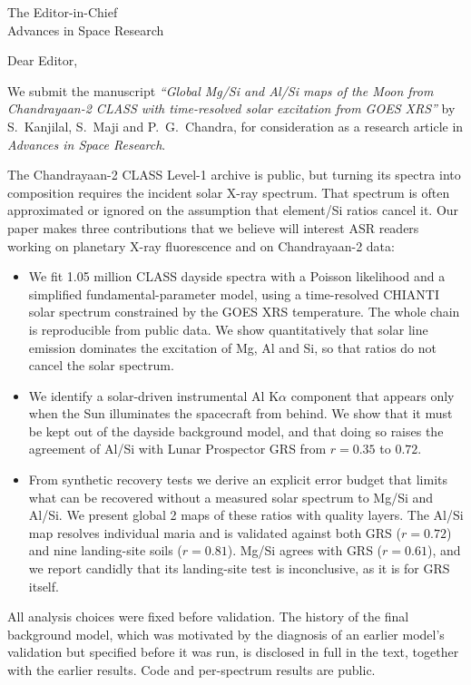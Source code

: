 \documentclass[11pt]{letter}
\begin{document}
\begin{letter}{The Editor-in-Chief\\Advances in Space Research}
\opening{Dear Editor,}

We submit the manuscript \emph{``Global Mg/Si and Al/Si maps of the Moon from Chandrayaan-2 CLASS with time-resolved solar excitation from GOES XRS''} by S.~Kanjilal, S.~Maji and P.~G.~Chandra, for consideration as a research article in \emph{Advances in Space Research}.

The Chandrayaan-2 CLASS Level-1 archive is public, but turning its spectra into composition requires the incident solar X-ray spectrum. That spectrum is often approximated or ignored on the assumption that element/Si ratios cancel it. Our paper makes three contributions that we believe will interest ASR readers working on planetary X-ray fluorescence and on Chandrayaan-2 data:
\begin{itemize}
\item We fit 1.05 million CLASS dayside spectra with a Poisson likelihood and a simplified fundamental-parameter model, using a time-resolved CHIANTI solar spectrum constrained by the GOES XRS temperature. The whole chain is reproducible from public data. We show quantitatively that solar line emission dominates the excitation of Mg, Al and Si, so that ratios do not cancel the solar spectrum.
\item We identify a solar-driven instrumental Al K$\alpha$ component that appears only when the Sun illuminates the spacecraft from behind. We show that it must be kept out of the dayside background model, and that doing so raises the agreement of Al/Si with Lunar Prospector GRS from $r=0.35$ to $0.72$.
\item From synthetic recovery tests we derive an explicit error budget that limits what can be recovered without a measured solar spectrum to Mg/Si and Al/Si. We present global 2\textdegree{} maps of these ratios with quality layers. The Al/Si map resolves individual maria and is validated against both GRS ($r=0.72$) and nine landing-site soils ($r=0.81$). Mg/Si agrees with GRS ($r=0.61$), and we report candidly that its landing-site test is inconclusive, as it is for GRS itself.
\end{itemize}

All analysis choices were fixed before validation. The history of the final background model, which was motivated by the diagnosis of an earlier model's validation but specified before it was run, is disclosed in full in the text, together with the earlier results. Code and per-spectrum results are public.


\end{letter}
\end{document}
